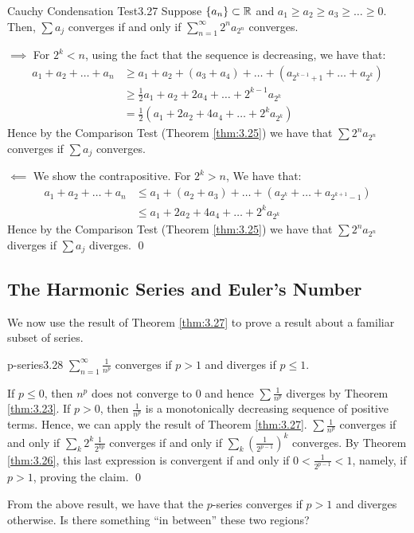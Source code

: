 \begin{theorem}{Cauchy Condensation Test}{3.27}
    Suppose $\set{a_n} \subset \mathbb{R}$ and $a_1 \geq a_2 \geq a_3 \geq \ldots \geq 0$. Then, $\sum a_j$ converges if and only if $\sum_{n=1}^\infty 2^n a_{2^n}$ converges.
\end{theorem}
\begin{nproof}
    $\boxed{\implies}$ For $2^k < n$, using the fact that the sequence is decreasing, we have that:
    \begin{align*}
        a_1 + a_2 + \ldots + a_n &\geq a_1 + a_2 + (a_3 + a_4) + \ldots + (a_{2^{k-1}+1} + \ldots + a_{2^k})
        \\ &\geq \frac{1}{2}a_1 + a_2 + 2a_4 + \ldots + 2^{k-1}a_{2^k}
        \\ &= \frac{1}{2}(a_1 + 2a_2 + 4a_4 + \ldots + 2^ka_{2^k})
    \end{align*}
    Hence by the Comparison Test (Theorem \ref{thm:3.25}) we have that $\sum 2^n a_{2^n}$ converges if $\sum a_j$ converges.

    $\boxed{\impliedby}$ We show the contrapositive. For $2^k > n$, We have that:
    \begin{align*}
        a_1 + a_2 + \ldots + a_n &\leq a_1 + (a_2 + a_3) + \ldots + (a_{2^k} + \ldots + a_{2^{k+1}-1})
        \\ &\leq a_1 + 2a_2 + 4a_4 + \ldots + 2^ka_{2^k}
    \end{align*}
    Hence by the Comparison Test (Theorem \ref{thm:3.25}) we have that $\sum 2^n a_{2^n}$ diverges if $\sum a_j$ diverges. \qed
\end{nproof}

\subsection{The Harmonic Series and Euler's Number}
We now use the result of Theorem \ref{thm:3.27} to prove a result about a familiar subset of series.

\begin{theorem}{p-series}{3.28}
    $\sum_{n=1}^\infty \frac{1}{n^p}$ converges if $p > 1$ and diverges if $p \leq 1$. 
\end{theorem}
\begin{nproof}
    If $p \leq 0$, then $n^p$ does not converge to $0$ and hence $\sum \frac{1}{n^p}$ diverges by Theorem \ref{thm:3.23}. If $p > 0$, then $\frac{1}{n^p}$ is a monotonically decreasing sequence of positive terms. Hence, we can apply the result of Theorem \ref{thm:3.27}. $\sum \frac{1}{n^p}$ converges if and only if $\sum_k 2^k \frac{1}{2^{kp}}$ converges if and only if $\sum_k \left(\frac{1}{2^{p-1}}\right)^k$ converges. By Theorem \ref{thm:3.26}, this last expression is convergent if and only if $0 < \frac{1}{2^{p-1}} < 1$, namely, if $p > 1$, proving the claim. \qed
\end{nproof}
\noindent From the above result, we have that the $p$-series converges if $p > 1$ and diverges otherwise. Is there something ``in between'' these two regions?

